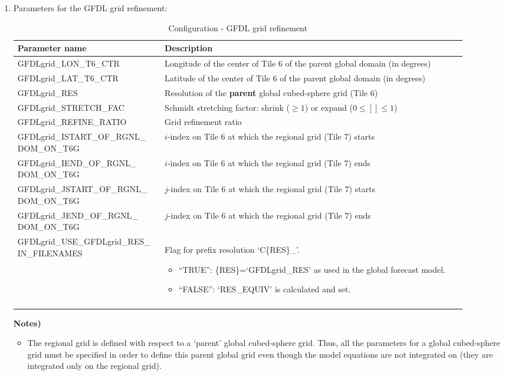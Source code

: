 \documentclass[11pt,fleqn]{report}              %
\begin{document}
\begin{enumerate}
\item Parameters for the GFDL grid refinement:
{
\scriptsize
\begin{longtable}{p{0.27\linewidth} | p{0.64\linewidth} }
\hline
\hline
Parameter name & Description \\
\hline
GFDLgrid\_LON\_T6\_CTR & Longitude of the center of Tile 6 of the parent global domain (in degrees) \\
GFDLgrid\_LAT\_T6\_CTR & Latitude of the center of Tile 6 of the parent global domain (in degrees) \\
GFDLgrid\_RES & Resolution of the {\bf parent} global cubed-sphere grid (Tile 6)  \\
GFDLgrid\_STRETCH\_FAC & Schmidt stretching factor: shrink ($\ge 1$) or expand ($0\le [] \le1$) \\
GFDLgrid\_REFINE\_RATIO & Grid refinement ratio \\
GFDLgrid\_ISTART\_OF\_RGNL\_ DOM\_ON\_T6G & $i$-index on Tile 6 at which the regional grid (Tile 7) starts \\
GFDLgrid\_IEND\_OF\_RGNL\_ DOM\_ON\_T6G & $i$-index on Tile 6 at which the regional grid (Tile 7) ends \\
GFDLgrid\_JSTART\_OF\_RGNL\_ DOM\_ON\_T6G & $j$-index on Tile 6 at which the regional grid (Tile 7) starts\\
GFDLgrid\_JEND\_OF\_RGNL\_ DOM\_ON\_T6G & $j$-index on Tile 6 at which the regional grid (Tile 7) ends  \\
GFDLgrid\_USE\_GFDLgrid\_RES\_ IN\_FILENAMES & Flag for prefix resolution `C\{RES\}\_'.  \begin{itemize} \item ``TRUE'': \{RES\}=`GFDLgrid\_RES' as used in the global forecast model.   \item ``FALSE'':  `RES\_EQUIV' is calculated and set. \vspace{0.1cm}  \end{itemize} \\
\hline
\caption{Configuration - GFDL grid refinement}
\label{table:config_GFDLgrid}
\end{longtable}
}
{\bf Notes)} 
\begin{itemize}
\item The regional grid is defined with respect to a `parent' global cubed-sphere grid. Thus, all the parameters for a global cubed-sphere grid must be specified in order to define this parent global grid even though the model equations are not integrated on (they are integrated only on the regional grid).

\end{itemize}
\end{enumerate}
\end{document}
